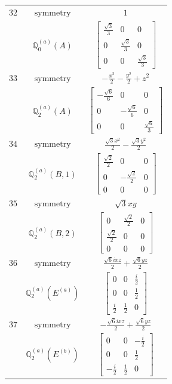 \documentclass[fleqn,8pt,landscape]{jsarticle}
\begin{document}
\begin{longtable}{ccc}
$ 32 $ & $ \text{symmetry} $ & $ 1 $ \\
$  $ & $ \mathbb{Q}_{0}^{(a)}(A) $ & $ \begin{bmatrix} \frac{\sqrt{3}}{3} & 0 & 0 \\ 0 & \frac{\sqrt{3}}{3} & 0 \\ 0 & 0 & \frac{\sqrt{3}}{3} \end{bmatrix} $ \\ \hline
$ 33 $ & $ \text{symmetry} $ & $ - \frac{x^{2}}{2} - \frac{y^{2}}{2} + z^{2} $ \\
$  $ & $ \mathbb{Q}_{2}^{(a)}(A) $ & $ \begin{bmatrix} - \frac{\sqrt{6}}{6} & 0 & 0 \\ 0 & - \frac{\sqrt{6}}{6} & 0 \\ 0 & 0 & \frac{\sqrt{6}}{3} \end{bmatrix} $ \\ \hline
$ 34 $ & $ \text{symmetry} $ & $ \frac{\sqrt{3} x^{2}}{2} - \frac{\sqrt{3} y^{2}}{2} $ \\
$  $ & $ \mathbb{Q}_{2}^{(a)}(B,1) $ & $ \begin{bmatrix} \frac{\sqrt{2}}{2} & 0 & 0 \\ 0 & - \frac{\sqrt{2}}{2} & 0 \\ 0 & 0 & 0 \end{bmatrix} $ \\ \hline
$ 35 $ & $ \text{symmetry} $ & $ \sqrt{3} x y $ \\
$  $ & $ \mathbb{Q}_{2}^{(a)}(B,2) $ & $ \begin{bmatrix} 0 & \frac{\sqrt{2}}{2} & 0 \\ \frac{\sqrt{2}}{2} & 0 & 0 \\ 0 & 0 & 0 \end{bmatrix} $ \\ \hline
$ 36 $ & $ \text{symmetry} $ & $ \frac{\sqrt{6} i x z}{2} + \frac{\sqrt{6} y z}{2} $ \\
$  $ & $ \mathbb{Q}_{2}^{(a)}(E^{(a)}) $ & $ \begin{bmatrix} 0 & 0 & \frac{i}{2} \\ 0 & 0 & \frac{1}{2} \\ \frac{i}{2} & \frac{1}{2} & 0 \end{bmatrix} $ \\ \hline
$ 37 $ & $ \text{symmetry} $ & $ - \frac{\sqrt{6} i x z}{2} + \frac{\sqrt{6} y z}{2} $ \\
$  $ & $ \mathbb{Q}_{2}^{(a)}(E^{(b)}) $ & $ \begin{bmatrix} 0 & 0 & - \frac{i}{2} \\ 0 & 0 & \frac{1}{2} \\ - \frac{i}{2} & \frac{1}{2} & 0 \end{bmatrix} $ \\ \hline

\end{longtable}
\end{document}
